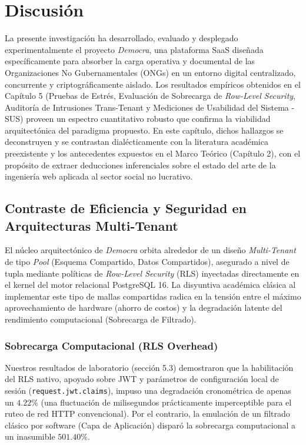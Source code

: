 \chapter{Discusi\'on}
\label{chapter:discusion}

La presente investigaci\'on ha desarrollado, evaluado y desplegado experimentalmente el proyecto \textit{Democra}, una plataforma SaaS dise\~nada espec\'ificamente para absorber la carga operativa y documental de las Organizaciones No Gubernamentales (ONGs) en un entorno digital centralizado, concurrente y criptogr\'aficamente aislado. Los resultados emp\'iricos obtenidos en el Cap\'itulo 5 (Pruebas de Estr\'es, Evaluaci\'on de Sobrecarga de \textit{Row-Level Security}, Auditor\'ia de Intrusiones Trans-Tenant y Mediciones de Usabilidad del Sistema - SUS) proveen un espectro cuantitativo robusto que confirma la viabilidad arquitect\'onica del paradigma propuesto. En este cap\'itulo, dichos hallazgos se deconstruyen y se contrastan dial\'ecticamente con la literatura acad\'emica preexistente y los antecedentes expuestos en el Marco Te\'orico (Cap\'itulo 2), con el prop\'osito de extraer deducciones inferenciales sobre el estado del arte de la ingenier\'ia web aplicada al sector social no lucrativo.

\section{Contraste de Eficiencia y Seguridad en Arquitecturas Multi-Tenant}

El n\'ucleo arquitect\'onico de \textit{Democra} orbita alrededor de un dise\~no \textit{Multi-Tenant} de tipo \textit{Pool} (Esquema Compartido, Datos Compartidos), asegurado a nivel de tupla mediante pol\'iticas de \textit{Row-Level Security} (RLS) inyectadas directamente en el kernel del motor relacional PostgreSQL 16. La disyuntiva acad\'emica cl\'asica al implementar este tipo de mallas compartidas radica en la tensi\'on entre el m\'aximo aprovechamiento de hardware (ahorro de costos) y la degradaci\'on latente del rendimiento computacional (Sobrecarga de Filtrado).

\subsection{Sobrecarga Computacional (RLS Overhead)}
Nuestros resultados de laboratorio (secci\'on 5.3) demostraron que la habilitaci\'on del RLS nativo, apoyado sobre JWT y par\'ametros de configuraci\'on local de sesi\'on (\texttt{request.jwt.claims}), impuso una degradaci\'on cronom\'etrica de apenas un $4.22\%$ (una fluctuaci\'on de milisegundos pr\'acticamente imperceptible para el ruteo de red HTTP convencional). Por el contrario, la emulaci\'on de un filtrado cl\'asico por software (Capa de Aplicaci\'on) dispar\'o la sobrecarga computacional a un inasumible $501.40\%$.

